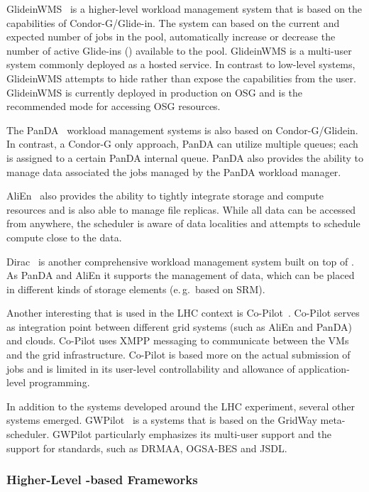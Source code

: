 \documentclass{sig-alternate}
\begin{document}
GlideinWMS~\cite{1742-6596-119-6-062044} is a higher-level workload management
system that is based on the \pilot capabilities of Condor-G/Glide-in. The
system can based on the current and expected number of jobs in the pool,
automatically increase or decrease the number of active Glide-ins (\pilots)
available to the pool. GlideinWMS is a multi-user \pilotjob system commonly
deployed as a hosted service. In contrast to low-level \pilotjob systems,
GlideinWMS attempts to hide rather than expose the \pilot capabilities from
the user. GlideinWMS is currently deployed in production on OSG and is the
recommended mode for accessing OSG resources.

The PanDA~\cite{1742-6596-331-7-072069} workload management systems is also 
based on Condor-G/Glidein. In contrast, a Condor-G only approach,
PanDA can utilize multiple queues; each \pilot is assigned to a certain PanDA
internal queue. PanDA also provides the ability to manage data associated the 
jobs managed by the PanDA workload manager.

AliEn~\cite{1742-6596-119-6-062012} also provides the ability to tightly 
integrate storage and compute resources and is also able to manage file 
replicas. While all data can be accessed from anywhere, the scheduler is aware 
of data localities and attempts to schedule compute close to the data.

Dirac~\cite{1742-6596-219-6-062049} is another comprehensive workload
management system built on top of \pilots. As PanDA and AliEn it supports the
management of data, which can be placed in different kinds of storage elements
(e.\,g.\ based on SRM).

Another interesting \pilot that is used in the LHC context is
Co-Pilot~\cite{copilot-tr}. Co-Pilot serves as integration point between
different grid \pilotjob systems (such as AliEn and PanDA) and clouds.
Co-Pilot uses XMPP messaging to communicate between the VMs and the grid
infrastructure. Co-Pilot is based more on the actual submission of jobs and is
limited in its user-level controllability and allowance of application-level
programming.

In addition to the \pilotjob systems developed around the LHC experiment, 
several other systems emerged. GWPilot~\cite{gwpilot} is a \pilot systems that 
is based on the GridWay meta-scheduler. GWPilot particularly emphasizes its 
multi-user support and the support for standards, such as DRMAA, OGSA-BES and 
JSDL.

\subsubsection*{Higher-Level \pilot-based Frameworks}
\end{document}
